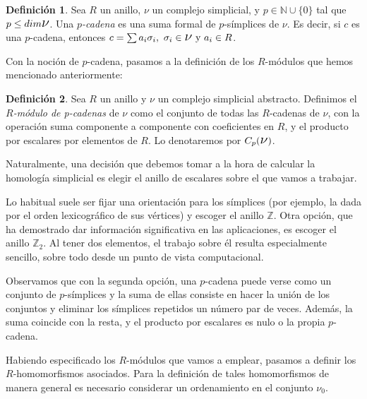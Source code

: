 \documentclass[12pt, a4paper, twoside]{book}
\numberwithin{equation}{section}
\theoremstyle{definition}
\newtheorem{defi}{Definición}[section]
\theoremstyle{remark}
\theoremstyle{plain}
\begin{document}
	\begin{defi}
		Sea $R$ un anillo, {\Large $\nu$} un complejo simplicial, y $p 
		\in \mathbb{N}\cup\{0\}$ 
		tal que $p\leq dim \text{{\Large $\nu$}}$. Una 
		\textit{$p$-cadena} es una suma formal de $p$-símplices de 
		{\Large $\nu$}. Es decir, si $c$ es una $p$-cadena, entonces 
		$c=\sum a_{i}\sigma_{i},\ \sigma_{i} \in 
		\text{{\Large $\nu$}}\text{ y } 
		a_{i} \in R$. 
	\end{defi}
	
	Con la noción de $p$-cadena, pasamos a la definición de los 
	$R$-módulos que hemos mencionado anteriormente:
	\begin{defi}
		Sea $R$ un anillo y {\Large $\nu$} un complejo simplicial 
		abstracto. Definimos
		el \textit{$R$-módulo de p-cadenas} de 
		{\Large $\nu$} como el conjunto de todas las $R$-cadenas de 
		{\Large $\nu$}, con la operación suma componente a componente 
		con coeficientes en $R$, y el producto por escalares 
		por elementos de $R$. Lo denotaremos por 
		$C_{p}(\text{{\Large $\nu$}})$. 	
	\end{defi}

	Naturalmente, una decisión que debemos tomar a la hora de calcular la 
	homología simplicial es elegir el anillo de escalares sobre el que 
	vamos a trabajar. 

	Lo habitual suele ser fijar una orientación para los 
	símplices (por ejemplo, la dada por el orden lexicográfico de sus 
	vértices) y escoger el anillo $\mathbb{Z}$. Otra opción, que ha 
	demostrado dar información significativa en las aplicaciones, es 
	escoger el anillo $\mathbb{Z}_{2}$. Al tener dos elementos, el trabajo 
	sobre él resulta especialmente sencillo, sobre todo desde un punto de 
	vista computacional.

	Observamos que con la segunda opción, una $p$-cadena puede verse como
	un conjunto de $p$-símplices y la suma de ellas consiste en hacer la 
	unión de los conjuntos y eliminar los símplices repetidos un número 
	par de veces. Además, la suma coincide con la resta, y el producto por 
	escalares es nulo o la propia $p$-cadena.
	
	Habiendo especificado los $R$-módulos que vamos a emplear, pasamos a
	definir los $R$-homomorfismos asociados. Para la definición de tales 
	homomorfismos de manera general es necesario considerar un 
	ordenamiento en el conjunto {\Large $\nu$}$_{0}$. 
\end{document}
